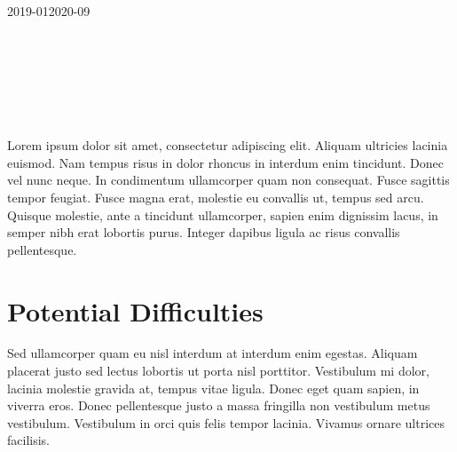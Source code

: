 \begin{ganttchart}[
	time slot format=isodate-yearmonth,
	time slot unit=month,
	]{2019-01}{2020-09}
	 \\
	 \\
	 \\
	 \\
	 \\
	 \\
	 \\
	
\end{ganttchart}

\medskip

Lorem ipsum dolor sit amet, consectetur adipiscing elit. Aliquam ultricies lacinia euismod. Nam tempus risus in dolor rhoncus in interdum enim tincidunt. Donec vel nunc neque. In condimentum ullamcorper quam non consequat. Fusce sagittis tempor feugiat. Fusce magna erat, molestie eu convallis ut, tempus sed arcu. Quisque molestie, ante a tincidunt ullamcorper, sapien enim dignissim lacus, in semper nibh erat lobortis purus. Integer dapibus ligula ac risus convallis pellentesque. 

\section{Potential Difficulties}

Sed ullamcorper quam eu nisl interdum at interdum enim egestas. Aliquam placerat justo sed lectus lobortis ut porta nisl porttitor. Vestibulum mi dolor, lacinia molestie gravida at, tempus vitae ligula. Donec eget quam sapien, in viverra eros. Donec pellentesque justo a massa fringilla non vestibulum metus vestibulum. Vestibulum in orci quis felis tempor lacinia. Vivamus ornare ultrices facilisis. 


